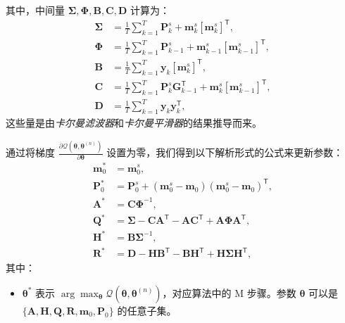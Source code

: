 \documentclass[presentation,aspectratio=169]{ctexbeamer}
\begin{document}
\begin{frame}
其中，中间量 \(\boldsymbol{\Sigma}, \boldsymbol{\Phi}, \mathbf{B}, \mathbf{C}, \mathbf{D}\) 计算为：
\begin{align}
    \boldsymbol{\Sigma} &= \frac{1}{T} \sum_{k=1}^{T} \mathbf{P}_k^s + \mathbf{m}_k^s [\mathbf{m}_k^s]^\mathsf{T}, \label{eq: middle Sigma} \\
    \boldsymbol{\Phi} &= \frac{1}{T} \sum_{k=1}^{T} \mathbf{P}_{k-1}^s + \mathbf{m}_{k-1}^s [\mathbf{m}_{k-1}^s]^\mathsf{T}, \label{eq: middle Phi} \\
    \mathbf{B} &= \frac{1}{T} \sum_{k=1}^{T} \mathbf{y}_k [\mathbf{m}_k^s]^\mathsf{T}, \label{eq: middle B} \\
    \mathbf{C} &= \frac{1}{T} \sum_{k=1}^{T} \mathbf{P}_k^s \mathbf{G}_{k-1}^\mathsf{T} + \mathbf{m}_k^s [\mathbf{m}_{k-1}^s]^\mathsf{T}, \label{eq: middle C} \\
    \mathbf{D} &= \frac{1}{T} \sum_{k=1}^{T} \mathbf{y}_k \mathbf{y}_k^\mathsf{T}, \label{eq: middle D}
\end{align}
这些量是由\textit{卡尔曼滤波器}和\textit{卡尔曼平滑器}的结果推导而来。
\end{frame}

\begin{frame}
通过将梯度 \(\frac{\partial \mathcal{Q} (\boldsymbol{\theta}, \boldsymbol{\theta}^{(n)})}{\partial \boldsymbol{\theta}}\) 设置为零，我们得到以下解析形式的公式来更新参数：
\begin{align}
    \mathbf{m}_0^* &= \mathbf{m}_0^s, \label{eq: EM-M m0} \\
    \mathbf{P}_0^* &= \mathbf{P}_0^s + (\mathbf{m}_0^s - \mathbf{m}_0)(\mathbf{m}_0^s - \mathbf{m}_0)^{\mathsf{T}}, \label{eq: EM-M P0} \\
    \mathbf{A}^* &= \mathbf{C} \boldsymbol{\Phi}^{-1}, \label{eq: EM-M A} \\
    \mathbf{Q}^* &= \boldsymbol{\Sigma} - \mathbf{C} \mathbf{A}^{\mathsf{T}} - \mathbf{A} \mathbf{C}^{\mathsf{T}} + \mathbf{A} \boldsymbol{\Phi} \mathbf{A}^{\mathsf{T}}, \label{eq: EM-M Q} \\
    \mathbf{H}^* &= \mathbf{B} \boldsymbol{\Sigma}^{-1}, \label{eq: EM-M H} \\
    \mathbf{R}^* &= \mathbf{D} - \mathbf{H} \mathbf{B}^{\mathsf{T}} - \mathbf{B} \mathbf{H}^{\mathsf{T}} + \mathbf{H} \boldsymbol{\Sigma} \mathbf{H}^{\mathsf{T}}, \label{eq: EM-M R}
\end{align}
其中：
\begin{itemize}
    \item \(\boldsymbol{\theta}^*\) 表示 \(\arg \max_{\boldsymbol{\theta}} \mathcal{Q}(\boldsymbol{\theta}, \boldsymbol{\theta}^{(n)})\)，对应算法中的 M 步骤。参数 \(\boldsymbol{\theta}\) 可以是 \(\{ \mathbf{A}, \mathbf{H}, \mathbf{Q}, \mathbf{R}, \mathbf{m}_0, \mathbf{P}_0 \}\) 的任意子集。
\end{itemize}
\end{frame}
\end{document}

